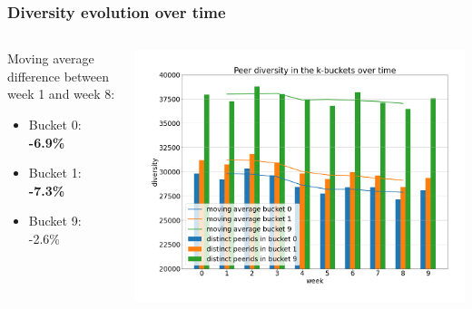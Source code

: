 \documentclass{pl-slide}
\begin{document}
\begin{frame}
\frametitle{Diversity evolution over time}

\begin{columns}[onlytextwidth]
\begin{column}{0.38\textwidth}
   Moving average difference between week 1 and week 8:
   \begin{itemize}
   		\item[] Bucket 0: \hspace{1em}\textbf{-6.9\%}
   		\item[] Bucket 1: \hspace{1em}\textbf{-7.3\%}
   		\item[] Bucket 9: \hspace{1em}-2.6\%
   \end{itemize}
\end{column}
\begin{column}{0.58\textwidth}
    \begin{center}
		\includegraphics[width=\textwidth]{plots/diversity-b0-b1-b9.png}
    \end{center}
\end{column}
\end{columns}
\end{frame}
\end{document}
